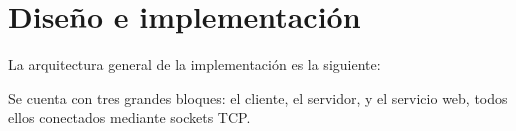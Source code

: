 \section{Diseño e implementación}

La arquitectura general de la implementación es la siguiente:

\begin{figure}[!h]
    
\end{figure}

Se cuenta con tres grandes bloques: el cliente, el servidor, y el servicio web, todos ellos conectados mediante sockets TCP.




